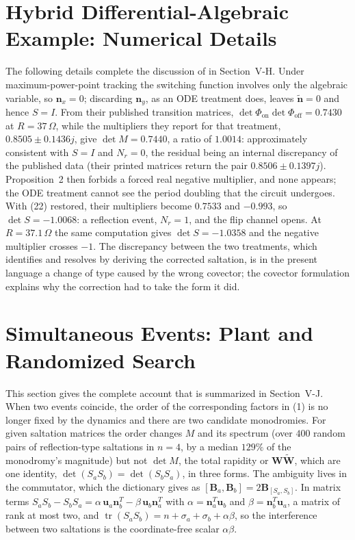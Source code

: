 \documentclass[journal]{IEEEtran}
\newcommand{\rev}[1]{\widetilde{#1}}
\begin{document}
\section{Hybrid Differential-Algebraic Example: Numerical Details}
The following details complete the discussion of \cite{hayes2020application}
in Section~V-H. Under maximum-power-point tracking the
switching function involves only the algebraic variable, so $\bm{n}_x=0$;
discarding $\bm{n}_y$, as an ODE treatment does, leaves $\tilde{\bm{n}}=0$
and hence $S=I$. From their published transition matrices,
$\det\Phi_{\mathrm{on}}\det\Phi_{\mathrm{off}}=0.7430$ at $R=37\,\Omega$,
while the multipliers they report for that treatment, $0.8505\pm0.1436j$,
give $\det M=0.7440$, a ratio of $1.0014$: approximately consistent with
$S=I$ and $N_r=0$, the residual being an internal discrepancy of the
published data (their printed matrices return the pair $0.8506\pm0.1397j$).
Proposition~2 then forbids a forced real negative
multiplier, and none appears; the ODE treatment cannot see the period
doubling that the circuit undergoes. With (22) restored, their
multipliers become $0.7533$ and $-0.993$, so $\det S=-1.0068$: a reflection
event, $N_r=1$, and the flip channel opens. At $R=37.1\,\Omega$ the same
computation gives $\det S=-1.0358$ and the negative multiplier crosses $-1$.
The discrepancy between the two treatments, which \cite{hayes2020application}
identifies and resolves by deriving the corrected saltation, is in the
present language a change of type caused by the wrong covector; the
covector formulation explains why the correction had to take the form it
did.

\section{Simultaneous Events: Plant and Randomized Search}
This section gives the complete account that is summarized in Section~V-J.
When two events coincide, the order of the corresponding factors in
(1) is no longer fixed by the dynamics and there are two
candidate monodromies. For given saltation matrices the order changes $M$
and its spectrum (over $400$ random pairs of reflection-type saltations in
$n=4$, by a median $129\%$ of the monodromy's magnitude) but not $\det M$,
the total rapidity or $\bm{W}\rev{\bm{W}}$, which are one identity,
$\det(S_aS_b)=\det(S_bS_a)$, in three forms. The ambiguity lives in the
commutator, which the dictionary gives as
$[\bm{B}_a,\bm{B}_b]=2\bm{B}_{[S_a,S_b]}$. In matrix terms
$S_aS_b-S_bS_a=\alpha\,\bm{u}_a\bm{n}_b^{T}-\beta\,\bm{u}_b\bm{n}_a^{T}$ with
$\alpha=\bm{n}_a^{T}\bm{u}_b$ and $\beta=\bm{n}_b^{T}\bm{u}_a$, a matrix of
rank at most two, and $\operatorname{tr}(S_aS_b)=n+\sigma_a+\sigma_b+\alpha\beta$,
so the interference between two saltations is the coordinate-free scalar
$\alpha\beta$.
\end{document}
